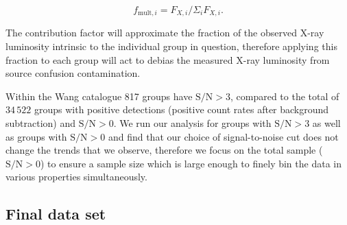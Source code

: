 \begin{equation}
  f_{\mathrm{mult},i} = F_{X,i} / \Sigma_i F_{X,i}.
\end{equation}

\noindent
The contribution factor will approximate the fraction of the observed
X-ray luminosity intrinsic to the individual group in question,
therefore applying this fraction to each group will act to debias the
measured X-ray luminosity from source confusion contamination.
\par
Within the Wang catalogue 817 groups have $\mathrm{S/N} > 3$, compared
to the total of $34\,522$ groups with positive detections (positive
count rates after background subtraction) and $\mathrm{S/N} > 0$.  We
run our analysis for groups with $\mathrm{S/N} > 3$ as well as groups
with $\mathrm{S/N} > 0$ and find that our choice of signal-to-noise
cut does not change the trends that we observe, therefore we focus on
the total sample ($\mathrm{S/N} > 0$) to ensure a sample size which is
large enough to finely bin the data in various properties
simultaneously.

\subsection{Final data set}

